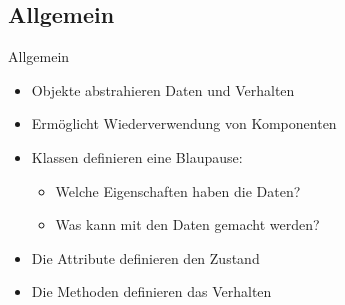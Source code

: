 {\subsection{Allgemein}
\begin{frame}{Allgemein}
   \begin{itemize}[<+(1)->]
      \itemsep14pt
      \item Objekte abstrahieren Daten und Verhalten
      \item Ermöglicht Wiederverwendung von Komponenten
      \item Klassen definieren eine Blaupause: \begin{itemize}
         \item Welche Eigenschaften haben die Daten? \hfill {}
         \item Was kann mit den Daten gemacht werden? \hfill {}
      \end{itemize}
      \item Die Attribute definieren den Zustand
      \item Die Methoden definieren das Verhalten
   \end{itemize}
\end{frame}
\SidebarReset

\def\Card#1#2{\begin{tikzpicture}
   \node (udbert) at(0,0) {\bjava{Penguin #1}};
   \node[below right,inner sep=0pt,xshift=4pt,align=left,draw,rounded corners=1pt] at (udbert.south west) {\begin{tabular}{l|p{4em}}
      #2
   \end{tabular}};
\end{tikzpicture}}

}
